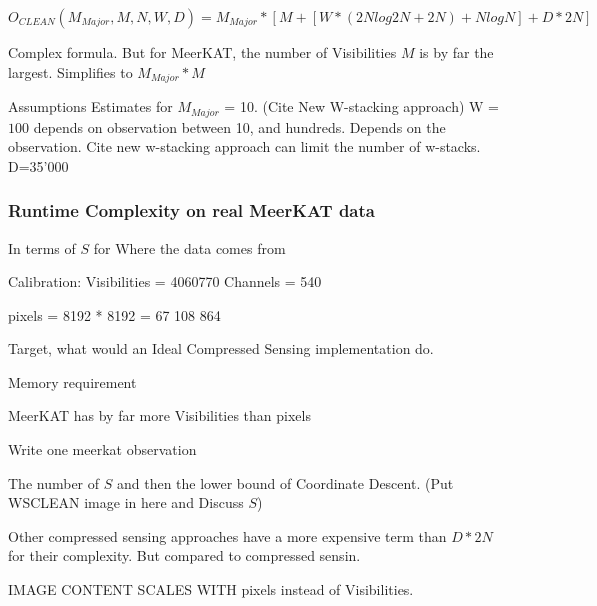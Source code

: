 \begin{equation}
O_{CLEAN}(M_{Major}, M, N,  W, D) = M_{Major} * [M + [W*(2N log 2N + 2N) + N log N] + D*2N]
\end{equation}

Complex formula. But for MeerKAT, the number of Visibilities $M$ is by far the largest. Simplifies to $M_{Major}*M$

Assumptions
Estimates for $M_{Major}$ = 10. (Cite New W-stacking approach)
W = $100$ depends on observation between 10, and hundreds. Depends on the observation. Cite new w-stacking approach can limit the number of w-stacks. 
D=35'000

\subsubsection{Runtime Complexity on real MeerKAT data}
In terms of $S$ for 
Where the data comes from

Calibration: 
Visibilities = 4060770
Channels = 540

pixels = 8192 * 8192 = 67 108 864

Target, what would an Ideal Compressed Sensing implementation do.

Memory requirement

MeerKAT has by far more Visibilities than pixels

Write one meerkat observation

The number of $S$ and then the lower bound of Coordinate Descent. (Put WSCLEAN image in here and Discuss $S$)



Other compressed sensing approaches have a more expensive term than $D*2N$ for their complexity. But compared to compressed sensin.


IMAGE CONTENT SCALES WITH pixels instead of Visibilities.

